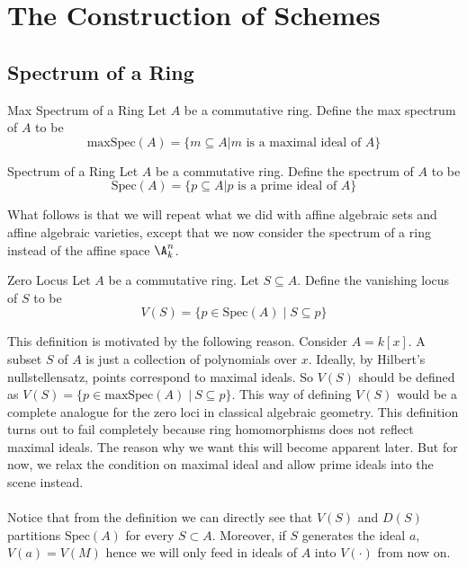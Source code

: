 \documentclass[a4paper]{article}
\begin{document}
\pagebreak
\section{The Construction of Schemes}
\subsection{Spectrum of a Ring}
\begin{defn}{Max Spectrum of a Ring}{} Let $A$ be a commutative ring. Define the max spectrum of $A$ to be $$\text{maxSpec}(A)=\{m\subseteq A|m\text{ is a maximal ideal of }A\}$$
\end{defn}

\begin{defn}{Spectrum of a Ring}{} Let $A$ be a commutative ring. Define the spectrum of $A$ to be $$\text{Spec}(A)=\{p\subseteq A|p\text{ is a prime ideal of }A\}$$
\end{defn}

What follows is that we will repeat what we did with affine algebraic sets and affine algebraic varieties, except that we now consider the spectrum of a ring instead of the affine space $\A_k^n$. 

\begin{defn}{Zero Locus}{} Let $A$ be a commutative ring. Let $S\subseteq A$. Define the vanishing locus of $S$ to be $$V(S)=\{p\in\text{Spec}(A)\;|\;S\subseteq p\}$$
\end{defn}

This definition is motivated by the following reason. Consider $A=k[x]$. A subset $S$ of $A$ is just a collection of polynomials over $x$. Ideally, by Hilbert's nullstellensatz, points correspond to maximal ideals. So $V(S)$ should be defined as $V(S)=\{p\in\text{maxSpec}(A)\;|\:S\subseteq p\}$. This way of defining $V(S)$ would be a complete analogue for the zero loci in classical algebraic geometry. This definition turns out to fail completely because ring homomorphisms does not reflect maximal ideals. The reason why we want this will become apparent later. But for now, we relax the condition on maximal ideal and allow prime ideals into the scene instead. \\~\\

Notice that from the definition we can directly see that $V(S)$ and $D(S)$ partitions $\text{Spec}(A)$ for every $S\subset A$. Moreover, if $S$ generates the ideal $a$, $V(a)=V(M)$ hence we will only feed in ideals of $A$ into $V(\cdot)$ from now on. 
\end{document}
